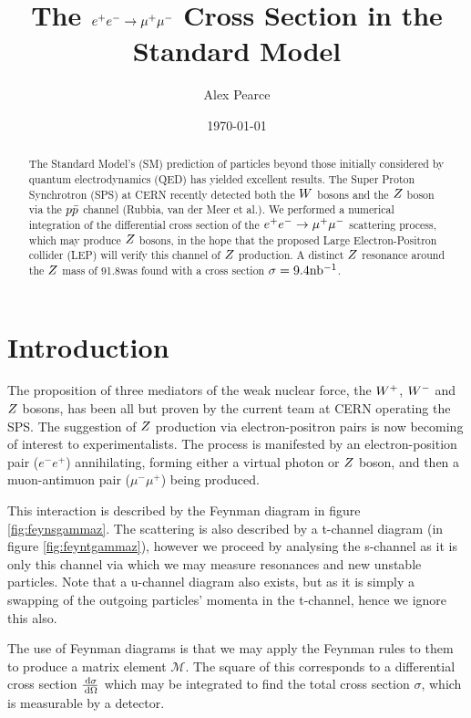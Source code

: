 \documentclass[]{article}
\begin{document}
\title{The $e^+ e^-  \rightarrow \mathrm{\mu^+ \mu^-} $ Cross Section in the Standard Model}
\author{Alex Pearce}
\date{\today}
\maketitle


\begin{abstract}
The Standard Model's (SM) prediction of particles beyond those initially considered by quantum electrodynamics (QED) has yielded excellent results. The Super Proton Synchrotron (SPS) at CERN recently detected both the $W $ bosons and the $Z $ boson via the $p\bar{p}$ channel (Rubbia, van der Meer et al.). We performed a numerical integration of the differential cross section of the $e^+ e^-  \rightarrow \mathrm{\mu^+ \mu^-} $ scattering process, which may produce $Z $ bosons, in the hope that the proposed Large Electron-Positron collider (LEP) will verify this channel of $Z $ production. A distinct $Z $ resonance around the $Z $ mass of 91.8\GeV was found with a cross section $\sigma=9.4\mbox{nb$^{-1}$} $.
\end{abstract}


\section{Introduction}\label{sec:intro}

The proposition of three mediators of the weak nuclear force, the $W^+ $, $W^- $ and $Z $ bosons, has been all but proven by the current team at CERN operating the SPS. The suggestion of $Z $ production via electron-positron pairs is now becoming of interest to experimentalists. The process is manifested by an electron-position pair ($e^{-}e^{+}$) annihilating, forming either a virtual photon or $Z $ boson, and then a muon-antimuon pair ($\mu^{-}\mu^{+}$) being produced.

This interaction is described by the Feynman diagram in figure \ref{fig:feynsgammaz}. The scattering is also described by a t-channel diagram (in figure \ref{fig:feyntgammaz}), however we proceed by analysing the s-channel as it is only this channel via which we may measure resonances and new unstable particles. Note that a u-channel diagram also exists, but as it is simply a swapping of the outgoing particles' momenta in the t-channel, hence we ignore this also.

The use of Feynman diagrams is that we may apply the Feynman rules to them to produce a  matrix element $\mathcal{M}$. The square of this corresponds to a differential cross section $\frac{\,\operatorname{d}\!{\sigma}}{\,\operatorname{d}\!{\Omega}}$ which may be integrated to find the total cross section $\sigma$, which is measurable by a detector.
\end{document}
